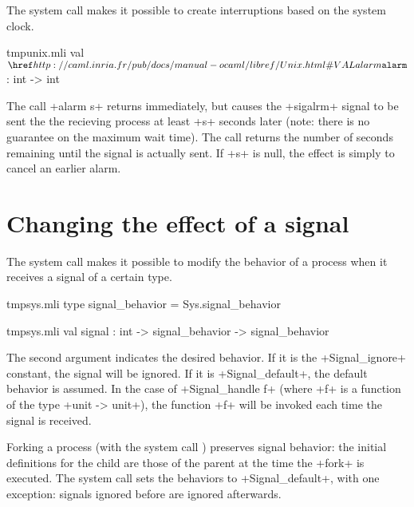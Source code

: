 The system call  makes it possible to create interruptions
based on the system clock.

%
\begin{listingcodefile}{tmpunix.mli}
val $\libvalue{Unix}{alarm}$ : int -> int
\end{listingcodefile}
%

The call \ml+alarm s+ returns immediately, but causes the \ml+sigalrm+ 
signal to be sent the the recieving process at least \ml+s+ seconds later 
(note: there is no guarantee on the maximum wait time).  The call returns 
the number of seconds remaining until the signal is actually sent.  
If \ml+s+ is null, the effect is simply to cancel an earlier alarm.

\section{Changing the effect of a signal}

The system call  makes it possible to modify the behavior
of a process when it receives a signal of a certain type.

%
\begin{codefile}{tmpsys.mli}
type signal_behavior = Sys.signal_behavior
\end{codefile}
%
\begin{listingcodefile}{tmpsys.mli}
val signal : int -> signal_behavior -> signal_behavior
\end{listingcodefile}
%

The second argument indicates the desired behavior.  If it is the 
\ml+Signal_ignore+ constant, the signal will be ignored.  If it is 
\ml+Signal_default+, the default behavior is assumed.  In the case of 
\ml+Signal_handle f+ (where \ml+f+ is a function of the type 
\ml+unit -> unit+), the function \ml+f+ will be 
invoked each time the signal is received.

Forking a process (with the system call ) preserves 
signal behavior: the initial definitions for the child are those of 
the parent at the time the \ml+fork+ is executed.  The  
system call sets the behaviors to \ml+Signal_default+, with one 
exception: signals ignored before are ignored afterwards.

